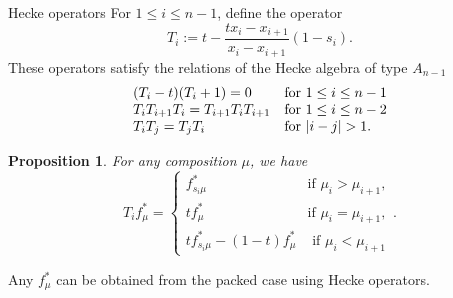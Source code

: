 \documentclass[10pt]{beamer}
\newtheorem{prop}[thm]{Proposition}
\theoremstyle{definition}
\theoremstyle{remark}
\begin{document}
\begin{frame}{Hecke operators}
    For $1\leq i\leq n-1$, define the operator 
\begin{equation*}
T_i:=t-\frac{tx_i-x_{i+1}}{x_i-x_{i+1}}(1-s_i).
\end{equation*}
\pause
These operators satisfy the relations of the Hecke algebra of type $A_{n-1}$
\begin{equation*}
\begin{array}{ll}
(T_i-t)(T_i+1)=0 & \text{for $1\leq i \leq n-1$}\\
 T_iT_{i+1}T_i=T_{i+1}T_iT_{i+1}    & \text{for $1\leq i \leq n-2$}\\
 T_iT_j=T_jT_i    & \text{for $ |i-j| > 1$}.\\
\end{array}
\end{equation*}

\begin{prop}
        For any composition $\mu$, we have
    \begin{equation*}
                T_i f^*_{\mu}=\begin{cases}
                    f^*_{s_i\mu} &\text{if $\mu_i>\mu_{i+1}$},\\
                    tf^*_{\mu} & \text{if $\mu_i=\mu_{i+1}$},\\
                    tf^*_{s_i\mu}-(1-t)f^*_{\mu}&\text{ if $\mu_i<\mu_{i+1}$}
                \end{cases}.
    \end{equation*}
\end{prop}
\vspace{-0.2cm}
Any $f^*_\mu$ can be obtained from the packed case using Hecke operators.
\end{frame}
\end{document}
